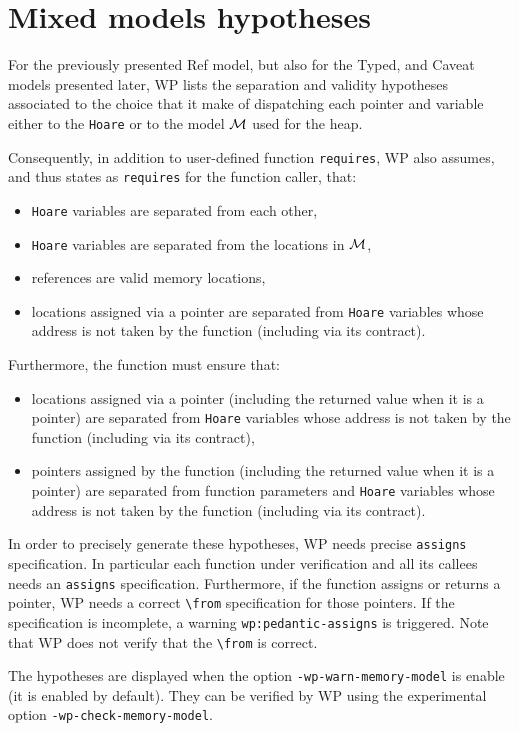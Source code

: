 \section{Mixed models hypotheses}
\label{wp-model-hypotheses}

For the previously presented \textsf{Ref} model, but also for the
\textsf{Typed}, and \textsf{Caveat} models presented later, WP lists
the separation and validity hypotheses associated to the choice that
it make of dispatching each pointer and variable either to the
\lstinline{Hoare} or to the model $\cal{M}$ used for the heap.

Consequently, in addition to user-defined function \lstinline{requires},
WP also assumes, and thus states as \lstinline{requires} for the function
caller, that:

\begin{itemize}
\item \lstinline{Hoare} variables are separated from each other,
\item \lstinline{Hoare} variables are separated from the locations in $\cal{M}$,
\item references are valid memory locations,
\item locations assigned via a pointer are separated from \lstinline{Hoare}
  variables whose address is not taken by the function (including via
  its contract).
\end{itemize}

Furthermore, the function must ensure that:

\begin{itemize}
\item locations assigned via a pointer (including the returned value when
  it is a pointer) are separated from \lstinline{Hoare} variables whose address
  is not taken by the function (including via its contract),
\item pointers assigned by the function (including the returned value when
  it is a pointer) are separated from function parameters and \lstinline{Hoare}
  variables whose address is not taken by the function (including via
  its contract).
\end{itemize}

In order to precisely generate these hypotheses, WP needs precise
\lstinline{assigns} specification. In particular each function under
verification and all its callees needs an \lstinline{assigns} specification.
Furthermore, if the function assigns or returns a pointer, WP needs
a correct \lstinline{\from} specification for those pointers. If the
specification is incomplete, a warning \lstinline{wp:pedantic-assigns} is
triggered. Note that WP does not verify that the \lstinline{\from} is correct.

The hypotheses are displayed when the option
\lstinline{-wp-warn-memory-model} is enable (it is enabled by default).
They can be verified by WP using the experimental option
\lstinline{-wp-check-memory-model}.
